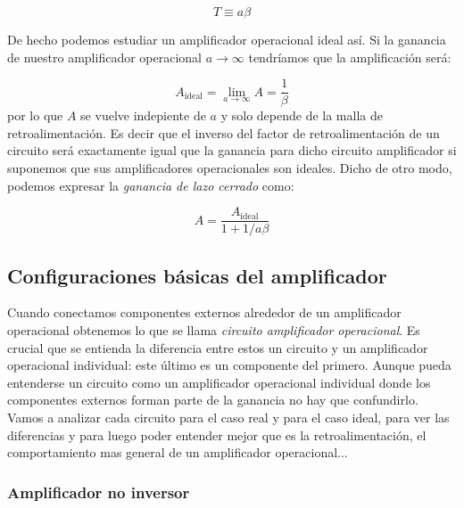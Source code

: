 \documentclass[12pt,a4paper]{article}
\numberwithin{equation}{section}
\numberwithin{figure}{section}
\begin{document}
\begin{equation}
T \equiv a \beta
\end{equation}

De hecho podemos estudiar un amplificador operacional ideal así. Si la ganancia de nuestro amplificador operacional $a \rightarrow \infty$ tendríamos que la amplificación será:

\begin{equation}
A_{\mathrm{ideal}} = \lim_{a \rightarrow \infty} A = \dfrac{1}{\beta}
\end{equation}
por lo que $A$ se vuelve indepiente de $a$ y solo depende de la malla de retroalimentación. Es decir que el inverso del factor de retroalimentación de un circuito será exactamente igual que la ganancia para dicho circuito amplificador si suponemos que sus amplificadores operacionales son ideales. Dicho de otro modo, podemos expresar la \textit{ganancia de lazo cerrado} como:

\begin{equation}
A = \dfrac{A_{\mathrm{ideal}}}{1+1/a\beta}
\end{equation}


\subsection{Configuraciones básicas del amplificador \label{Subsec:1.3}} 

Cuando conectamos componentes externos alrededor de un amplificador operacional obtenemos lo que se llama \textit{circuito amplificador operacional}. Es crucial que se entienda la diferencia entre estos un circuito y un amplificador operacional individual: este último es un componente del primero. Aunque pueda entenderse un circuito como un amplificador operacional individual donde los componentes externos forman parte de la ganancia no hay que confundirlo. \\

Vamos a analizar cada circuito para el caso real y para el caso ideal, para ver las diferencias y para luego poder entender mejor que es la retroalimentación, el comportamiento mas general de un amplificador operacional...

\subsubsection{Amplificador no inversor}
\end{document}
